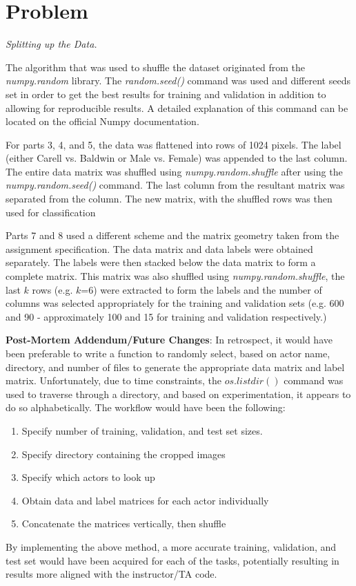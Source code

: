 \documentclass{article}
\newcommand{\enterProblemHeader}[1]{
}
\newcommand{\exitProblemHeader}[1]{
}
\newcounter{homeworkProblemCounter} %
\newcommand{\homeworkProblemName}{}
\newenvironment{homeworkProblem}[1][Problem \arabic{homeworkProblemCounter}]{ %
\stepcounter{homeworkProblemCounter} %
\renewcommand{\homeworkProblemName}{#1} %
\section{\homeworkProblemName} %
\enterProblemHeader{\homeworkProblemName} %
}{
\exitProblemHeader{\homeworkProblemName} %
}
\begin{document}
\clearpage

\begin{homeworkProblem}
\noindent \textit{Splitting up the Data.}

\par The algorithm that was used to shuffle the dataset originated from the \textit{numpy.random} library.  The \textit{random.seed()} command was used and different seeds set in order to get the best results for training and validation in addition to allowing for reproducible results.  A detailed explanation of this command can be located on the official Numpy documentation.

For parts 3, 4, and 5, the data was flattened into rows of 1024 pixels.  The label (either Carell vs.  Baldwin or Male vs. Female) was appended to the last column.  The entire data matrix was shuffled using \textit{numpy.random.shuffle} after using the \textit{numpy.random.seed()} command.  The last column from the resultant matrix was separated from the column.  The new matrix, with the shuffled rows was then used for classification

Parts 7 and 8 used a different scheme and the matrix geometry taken from the assignment specification.  The data matrix and data labels were obtained separately.  The labels were then stacked below the data matrix to form a complete matrix.  This matrix was also shuffled using \textit{numpy.random.shuffle}, the last $k$ rows (e.g. $k$=6) were extracted to form the labels and the number of columns was selected appropriately for the training and validation sets (e.g. 600 and 90 - approximately 100 and 15 for training and validation respectively.)

\textbf{Post-Mortem Addendum/Future Changes}:  In retrospect, it would have been preferable to write a function to randomly select, based on actor name, directory, and number of files to generate the appropriate data matrix and label matrix.  Unfortunately, due to time constraints, the $os.listdir()$ command was used to traverse through a directory, and based on experimentation, it appears to do so alphabetically.  The workflow would have been the following:
\begin{enumerate}
\item Specify number of training, validation, and test set sizes.
\item Specify directory containing the cropped images
\item Specify which actors to look up
\item Obtain data and label matrices for each actor individually
\item Concatenate the matrices vertically, then shuffle
\end{enumerate}
By implementing the above method, a more accurate training, validation, and test set would have been acquired for each of the tasks, potentially resulting in results more aligned with the instructor/TA code.

\end{homeworkProblem}
\end{document}
